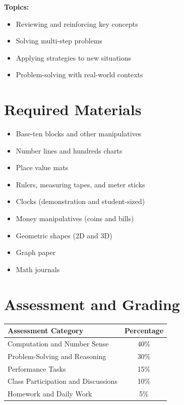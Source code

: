 \documentclass[11pt,letterpaper]{report}
\begin{document}
\textbf{Topics:}
\begin{itemize}
    \item Reviewing and reinforcing key concepts
    \item Solving multi-step problems
    \item Applying strategies to new situations
    \item Problem-solving with real-world contexts
\end{itemize}

\section{Required Materials}

\begin{itemize}
    \item Base-ten blocks and other manipulatives
    \item Number lines and hundreds charts
    \item Place value mats
    \item Rulers, measuring tapes, and meter sticks
    \item Clocks (demonstration and student-sized)
    \item Money manipulatives (coins and bills)
    \item Geometric shapes (2D and 3D)
    \item Graph paper
    \item Math journals
\end{itemize}

\section{Assessment and Grading}

\begin{center}
\begin{tabular}{|l|c|}
\hline
\textbf{Assessment Category} & \textbf{Percentage} \\
\hline
Computation and Number Sense & 40\% \\
\hline
Problem-Solving and Reasoning & 30\% \\
\hline
Performance Tasks & 15\% \\
\hline
Class Participation and Discussions & 10\% \\
\hline
Homework and Daily Work & 5\% \\
\hline
\end{tabular}
\end{center}
\end{document}
